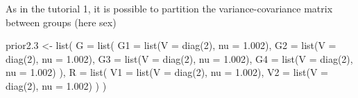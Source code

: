 \documentclass[
  12pt,
]{book}
\newenvironment{Shaded}{\begin{snugshade}}{\end{snugshade}}
\newcommand{\AttributeTok}[1]{\textcolor[rgb]{0.77,0.63,0.00}{#1}}
\newcommand{\DecValTok}[1]{\textcolor[rgb]{0.00,0.00,0.81}{#1}}
\newcommand{\FloatTok}[1]{\textcolor[rgb]{0.00,0.00,0.81}{#1}}
\newcommand{\FunctionTok}[1]{\textcolor[rgb]{0.00,0.00,0.00}{#1}}
\newcommand{\NormalTok}[1]{#1}
\newcommand{\OtherTok}[1]{\textcolor[rgb]{0.56,0.35,0.01}{#1}}
\begin{document}
As in the tutorial 1, it is possible to partition the variance-covariance matrix between groups (here sex)

\begin{Shaded}
\begin{Highlighting}[]
\NormalTok{prior2}\FloatTok{.3} \OtherTok{\textless{}{-}} \FunctionTok{list}\NormalTok{(}
  \AttributeTok{G =} \FunctionTok{list}\NormalTok{(}
    \AttributeTok{G1 =} \FunctionTok{list}\NormalTok{(}\AttributeTok{V =} \FunctionTok{diag}\NormalTok{(}\DecValTok{2}\NormalTok{), }\AttributeTok{nu =} \FloatTok{1.002}\NormalTok{),}
    \AttributeTok{G2 =} \FunctionTok{list}\NormalTok{(}\AttributeTok{V =} \FunctionTok{diag}\NormalTok{(}\DecValTok{2}\NormalTok{), }\AttributeTok{nu =} \FloatTok{1.002}\NormalTok{),}
    \AttributeTok{G3 =} \FunctionTok{list}\NormalTok{(}\AttributeTok{V =} \FunctionTok{diag}\NormalTok{(}\DecValTok{2}\NormalTok{), }\AttributeTok{nu =} \FloatTok{1.002}\NormalTok{),}
    \AttributeTok{G4 =} \FunctionTok{list}\NormalTok{(}\AttributeTok{V =} \FunctionTok{diag}\NormalTok{(}\DecValTok{2}\NormalTok{), }\AttributeTok{nu =} \FloatTok{1.002}\NormalTok{)}
\NormalTok{  ),}
  \AttributeTok{R =} \FunctionTok{list}\NormalTok{(}
    \AttributeTok{V1 =} \FunctionTok{list}\NormalTok{(}\AttributeTok{V =} \FunctionTok{diag}\NormalTok{(}\DecValTok{2}\NormalTok{), }\AttributeTok{nu =} \FloatTok{1.002}\NormalTok{),}
    \AttributeTok{V2 =} \FunctionTok{list}\NormalTok{(}\AttributeTok{V =} \FunctionTok{diag}\NormalTok{(}\DecValTok{2}\NormalTok{), }\AttributeTok{nu =} \FloatTok{1.002}\NormalTok{)}
\NormalTok{  )}
\NormalTok{)}


\end{Highlighting}
\end{Shaded}
\end{document}
